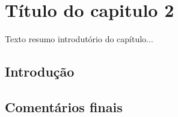\graphicspath{{figuras/}}

\chapter{Título do capitulo 2}
\label{cap2}

Texto resumo introdutório do capítulo...

\section{Introdução}


\section{Comentários finais}